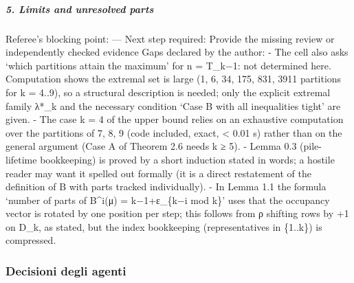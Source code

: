 \documentclass[11pt,a4paper]{article}
\begin{document}
\subparagraph{5. Limits and unresolved
parts}\label{limits-and-unresolved-parts}

Referee's blocking point: --- Next step required: Provide the missing
review or independently checked evidence Gaps declared by the author: -
The cell also asks `which partitions attain the maximum' for n = T\_k−1:
not determined here. Computation shows the extremal set is large (1, 6,
34, 175, 831, 3911 partitions for k = 4..9), so a structural description
is needed; only the explicit extremal family λ*\_k and the necessary
condition `Case B with all inequalities tight' are given. - The case k =
4 of the upper bound relies on an exhaustive computation over the
partitions of 7, 8, 9 (code included, exact, \textless{} 0.01 s) rather
than on the general argument (Case A of Theorem 2.6 needs k ≥ 5). -
Lemma 0.3 (pile-lifetime bookkeeping) is proved by a short induction
stated in words; a hostile reader may want it spelled out formally (it
is a direct restatement of the definition of B with parts tracked
individually). - In Lemma 1.1 the formula `number of parts of B\^{}i(μ)
= k−1+ε\_\{k−i mod k\}' uses that the occupancy vector is rotated by one
position per step; this follows from ρ shifting rows by +1 on D\_k, as
stated, but the index bookkeeping (representatives in \{1..k\}) is
compressed.

\subsubsection{Decisioni degli agenti}
\end{document}
